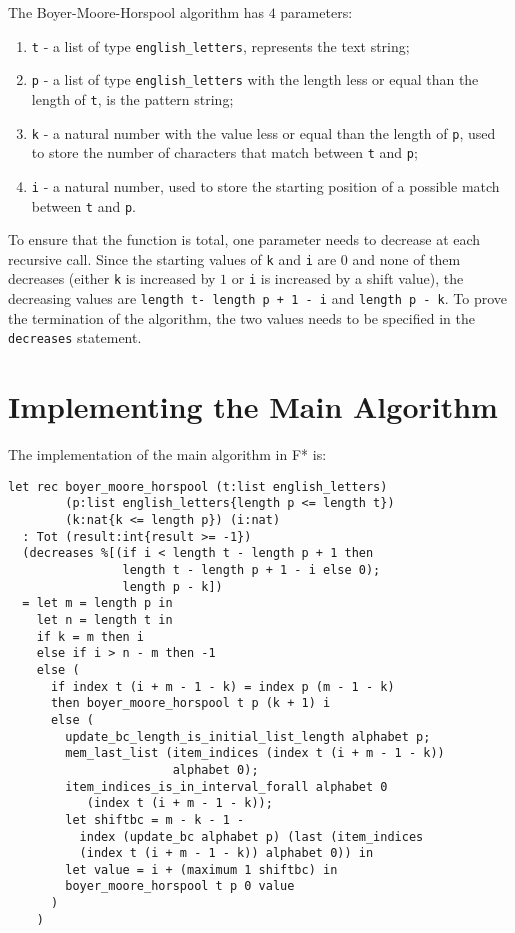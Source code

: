 The Boyer-Moore-Horspool algorithm has \(4\) parameters:
\begin{enumerate}
\item \texttt{t} - a list of type \texttt{english\_letters}, represents the text string;
\item \texttt{p} - a list of type \texttt{english\_letters} with the length less or equal than the length of \texttt{t}, is the pattern string;
\item \texttt{k} - a natural number with the value less or equal than the length of \texttt{p}, used to store the number of characters that match between \texttt{t} and \texttt{p};
\item \texttt{i} - a natural number, used to store the starting position of a possible match between \texttt{t} and \texttt{p}.
\end{enumerate}

To ensure that the function is total, one parameter needs to decrease at each recursive call. Since the starting values of \texttt{k} and \texttt{i} are \(0\) and none of them decreases (either \texttt{k} is increased by \(1\) or \texttt{i} is increased by a shift value), the decreasing values are \texttt{length t- length p + 1 - i} and \texttt{length p - k}. To prove the termination of the algorithm, the two values needs to be specified in the \texttt{decreases} statement.

\section{Implementing the Main Algorithm}

The implementation of the main algorithm in F* is:

\begin{verbatim}
let rec boyer_moore_horspool (t:list english_letters)
        (p:list english_letters{length p <= length t})
        (k:nat{k <= length p}) (i:nat)
  : Tot (result:int{result >= -1})
  (decreases %[(if i < length t - length p + 1 then
                length t - length p + 1 - i else 0);
                length p - k])
  = let m = length p in
    let n = length t in
    if k = m then i
    else if i > n - m then -1
    else (
      if index t (i + m - 1 - k) = index p (m - 1 - k)
      then boyer_moore_horspool t p (k + 1) i
      else (
        update_bc_length_is_initial_list_length alphabet p;
        mem_last_list (item_indices (index t (i + m - 1 - k))
                       alphabet 0);
        item_indices_is_in_interval_forall alphabet 0
           (index t (i + m - 1 - k));
        let shiftbc = m - k - 1 - 
          index (update_bc alphabet p) (last (item_indices
          (index t (i + m - 1 - k)) alphabet 0)) in
        let value = i + (maximum 1 shiftbc) in
        boyer_moore_horspool t p 0 value
      )
    )
\end{verbatim}

